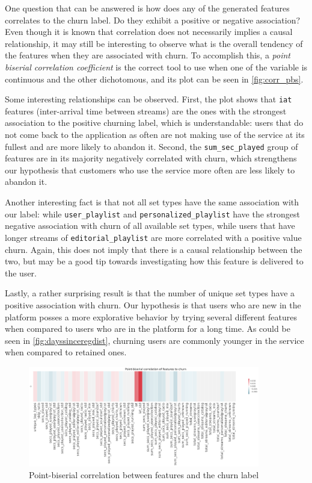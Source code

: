 \documentclass{kththesis}
\begin{document}
One question that can be answered is how does any of the generated features correlates to the churn label. Do they exhibit a positive or negative association? Even though it is known that correlation does not necessarily implies a causal relationship, it may still be interesting to observe what is the overall tendency of the features when they are associated with churn. To accomplish this, a \emph{point biserial correlation coefficient} is the correct tool to use when one of the variable is continuous and the other dichotomous, and its plot can be seen in \autoref{fig:corr_pbs}.

Some interesting relationships can be observed. First, the plot shows that \verb|iat| features (inter-arrival time between streams) are the ones with the strongest association to the positive churning label, which is understandable: users that do not come back to the application as often are not making use of the service at its fullest and are more likely to abandon it. Second, the \verb|sum_sec_played| group of features are in its majority negatively correlated with churn, which strengthens our hypothesis that customers who use the service more often are less likely to abandon it. 

Another interesting fact is that not all set types have the same association with our label: while \verb|user_playlist| and \verb|personalized_playlist| have the strongest negative association with churn of all available set types, while users that have longer streams of \verb|editorial_playlist| are more correlated with a positive value churn. Again, this does not imply that there is a causal relationship between the two, but may be a good tip towards investigating how this feature is delivered to the user.

Lastly, a rather surprising result is that the number of unique set types have a positive association with churn. Our hypothesis is that users who are new in the platform posses a more explorative behavior by trying several different features when compared to users who are in the platform for a long time. As could be seen in \autoref{fig:dayssinceregdist}, churning users are commonly younger in the service when compared to retained ones. 

	\begin{figure}[H]
    \centering
    \includegraphics[width=0.9\textwidth,keepaspectratio]{figures/corr_pbs.pdf}
    \caption{Point-biserial correlation between features and the churn label}
    \label{fig:corr_pbs}
	\end{figure}
\end{document}
